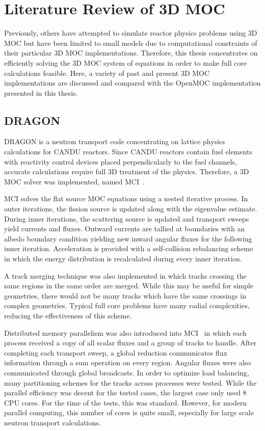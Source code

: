 \section{Literature Review of 3D MOC}
\label{sec:lit-review}

Previously, others have attempted to simulate reactor physics problems using 3D \ac{MOC} but have been limited to small models due to computational constraints of their particular 3D \ac{MOC} implementations. Therefore, this thesis concentrates on efficiently solving the 3D \ac{MOC} system of equations in order to make full core calculations feasible. Here, a variety of past and present 3D \ac{MOC} implementations are discussed and compared with the OpenMOC implementation presented in this thesis.

\subsection{DRAGON}
\label{sec:dragon}
DRAGON is a neutron transport code concentrating on lattice physics calculations for CANDU reactors. Since CANDU reactors contain fuel elements with reactivity control devices placed perpendicularly to the fuel channels, accurate calculations require full 3D treatment of the physics. Therefore, a 3D \ac{MOC} solver was implemented, named MCI~\cite{dragon_3d_moc}. 

MCI solves the flat source \ac{MOC} equations using a nested iterative process. In outer iterations, the fission source is updated along with the eigenvalue estimate. During inner iterations, the scattering source is updated and transport sweeps yield currents and fluxes. Outward currents are tallied at boundaries with an albedo boundary condition yielding new inward angular fluxes for the following inner iteration. Acceleration is provided with a self-collision rebalancing scheme in which the energy distribution is recalculated during every inner iteration.

A track merging technique was also implemented in which tracks crossing the same regions in the same order are merged. While this may be useful for simple geometries, there would not be many tracks which have the same crossings in complex geometries. Typical full core problems have many radial complexities, reducing the effectiveness of this scheme.

Distributed memory parallelism was also introduced into MCI~\cite{dragon_parallel} in which each process received a copy of all scalar fluxes and a group of tracks to handle. After completing each transport sweep, a global reduction communicates flux information through a sum operation on every region. Angular fluxes were also communicated through global broadcasts. In order to optimize load balancing, many partitioning schemes for the tracks across processes were tested. While the parallel efficiency was decent for the tested cases, the largest case only used 8 CPU cores. For the time of the tests, this was standard. However, for modern parallel computing, this number of cores is quite small, especially for large scale neutron transport calculations.

